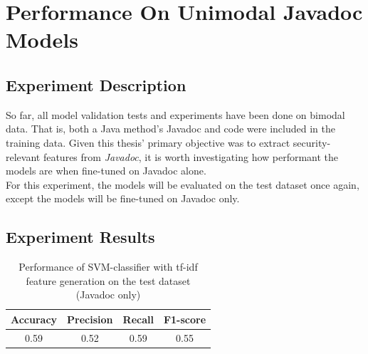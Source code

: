\section{Performance On Unimodal Javadoc Models}
\label{javadoc_experiment}
\subsection{Experiment Description}

\noindent
So far, all model validation tests and experiments have been done on bimodal data. That is, both a Java method's Javadoc and code were included in the training data. Given this thesis' primary objective was to extract security-relevant features from \emph{Javadoc}, it is worth investigating how performant the models are when fine-tuned on Javadoc alone. \\

\noindent
For this experiment, the models will be evaluated on the test dataset once again, except the models will be fine-tuned on Javadoc only. \\


\subsection{Experiment Results}

\begin{table}[H]
    \caption{Performance of SVM-classifier with tf-idf feature generation on the test dataset (Javadoc only)}
    \label{tab:test_perfomance_tfidf_svm_javadoc}
        \begin{center}
            \begin{tabular}{c|c|c|c}
                \textbf{Accuracy} & \textbf{Precision} & \textbf{Recall} & \textbf{F1-score}  \\
                \hline
                0.59 & 0.52 & 0.59 & 0.55 \\
            \end{tabular}
        \end{center}
    \end{table}
    
